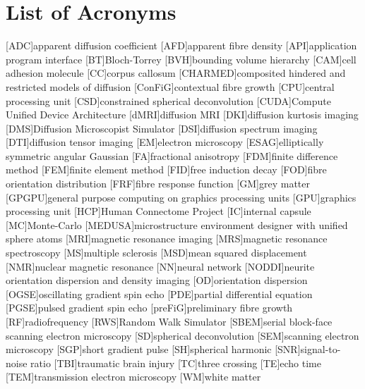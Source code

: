 
\chapter*{List of Acronyms}

\makeatletter
\patchcmd{\AC@@acro}{] #3}{] \MakeUppercase #3}{}{}
\patchcmd{\AC@@acro}{] #3}{] \MakeUppercase #3}{}{}
\makeatother
\begin{acronym}
  [ADC]{apparent diffusion coefficient}
  [AFD]{apparent fibre density}
  [API]{application program interface}
  [BT]{Bloch-Torrey}
  [BVH]{bounding volume hierarchy}
  [CAM]{cell adhesion molecule}
  [CC]{corpus callosum}
  [CHARMED]{composited hindered and restricted models of diffusion}
  [ConFiG]{contextual fibre growth}
  [CPU]{central processing unit}
  [CSD]{constrained spherical deconvolution}
  [CUDA]{Compute Unified Device Architecture}
  [dMRI]{diffusion MRI}
  [DKI]{diffusion kurtosis imaging}
  [DMS]{Diffusion Microscopist Simulator}
  [DSI]{diffusion spectrum imaging}
  [DTI]{diffusion tensor imaging}
  [EM]{electron microscopy}
  [ESAG]{elliptically symmetric angular Gaussian}
  [FA]{fractional anisotropy}
  [FDM]{finite difference method}
  [FEM]{finite element method}
  [FID]{free induction decay}
  [FOD]{fibre orientation distribution}
  [FRF]{fibre response function}
  [GM]{grey matter}
  [GPGPU]{general purpose computing on graphics processing units}
  [GPU]{graphics processing unit}
  [HCP]{Human Connectome Project}
  [IC]{internal capsule}
  [MC]{Monte-Carlo}
  [MEDUSA]{microstructure environment designer with unified sphere atoms}
  [MRI]{magnetic resonance imaging}
  [MRS]{magnetic resonance spectroscopy}
  [MS]{multiple sclerosis}
  [MSD]{mean squared displacement}
  [NMR]{nuclear magnetic resonance}
  [NN]{neural network}
  [NODDI]{neurite orientation dispersion and density imaging}
  [OD]{orientation dispersion}
  [OGSE]{oscillating gradient spin echo}
  [PDE]{partial differential equation}
  [PGSE]{pulsed gradient spin echo}
  [preFiG]{preliminary fibre growth}
  [RF]{radiofrequency}
  [RWS]{Random Walk Simulator}
  [SBEM]{serial block-face scanning electron microscopy}
  [SD]{spherical deconvolution}
  [SEM]{scanning electron microscopy}
  [SGP]{short gradient pulse}
  [SH]{spherical harmonic}
  [SNR]{signal-to-noise ratio}
  [TBI]{traumatic brain injury}
  [TC]{three crossing}
  [TE]{echo time}
  [TEM]{transmission electron microscopy}
  [WM]{white matter}
\end{acronym}


